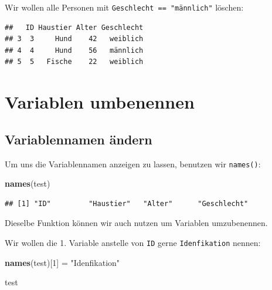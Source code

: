 \documentclass[
]{book}
\newenvironment{Shaded}{\begin{snugshade}}{\end{snugshade}}
\newcommand{\CommentTok}[1]{\textcolor[rgb]{0.56,0.35,0.01}{\textit{#1}}}
\newcommand{\DecValTok}[1]{\textcolor[rgb]{0.00,0.00,0.81}{#1}}
\newcommand{\FunctionTok}[1]{\textcolor[rgb]{0.13,0.29,0.53}{\textbf{#1}}}
\newcommand{\NormalTok}[1]{#1}
\newcommand{\OtherTok}[1]{\textcolor[rgb]{0.56,0.35,0.01}{#1}}
\newcommand{\SpecialCharTok}[1]{\textcolor[rgb]{0.81,0.36,0.00}{\textbf{#1}}}
\newcommand{\StringTok}[1]{\textcolor[rgb]{0.31,0.60,0.02}{#1}}
\begin{document}
Wir wollen alle Personen mit \texttt{Geschlecht\ ==\ "männlich"} löschen:

\begin{Shaded}
\end{Shaded}

\begin{verbatim}
##   ID Haustier Alter Geschlecht
## 3  3     Hund    42   weiblich
## 4  4     Hund    56   männlich
## 5  5   Fische    22   weiblich
\end{verbatim}

\section{Variablen umbenennen}\label{variablen-umbenennen}

\subsection{Variablennamen ändern}\label{variablennamen-uxe4ndern}

Um uns die Variablennamen anzeigen zu lassen, benutzen wir \texttt{names()}:

\begin{Shaded}
\begin{Highlighting}[]
\FunctionTok{names}\NormalTok{(test)}
\end{Highlighting}
\end{Shaded}

\begin{verbatim}
## [1] "ID"         "Haustier"   "Alter"      "Geschlecht"
\end{verbatim}

Dieselbe Funktion können wir auch nutzen um Variablen umzubenennen.

Wir wollen die 1. Variable anstelle von \texttt{ID} gerne \texttt{Idenfikation} nennen:

\begin{Shaded}
\begin{Highlighting}[]
\FunctionTok{names}\NormalTok{(test)[}\DecValTok{1}\NormalTok{] }\OtherTok{=} \StringTok{"Idenfikation"}

\NormalTok{test}
\end{Highlighting}
\end{Shaded}
\end{document}
